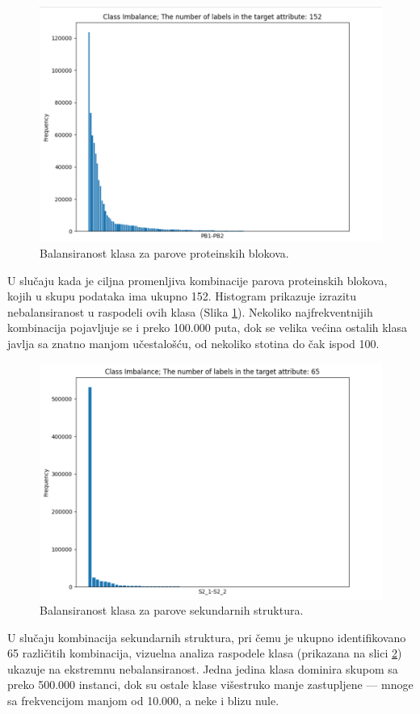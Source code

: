 \documentclass[a4paper,12pt]{article}
\begin{document}
\\
\begin{figure}[htbp]
    \centering
    \includegraphics[width=1\textwidth]{./images/pb_imbalance.png}
    \caption{Balansiranost klasa za parove proteinskih blokova.}
    \label{Slika:pb_imbalance}
\end{figure}

U slučaju kada je ciljna promenljiva kombinacije parova proteinskih blokova, kojih u skupu podataka ima ukupno 152. Histogram prikazuje izrazitu nebalansiranost u raspodeli ovih klasa (Slika \ref{Slika:pb_imbalance}). Nekoliko najfrekventnijih kombinacija pojavljuje se i preko 100.000 puta, dok se velika većina ostalih klasa javlja sa znatno manjom učestalošću, od nekoliko stotina do čak ispod 100.
\\
\begin{figure}[htbp]
    \centering
    \includegraphics[width=1\textwidth]{./images/ss_imbalance.png}
    \caption{Balansiranost klasa za parove sekundarnih struktura.}
    \label{Slika:ss_imbalance}
\end{figure}
U slučaju kombinacija sekundarnih struktura, pri čemu je ukupno identifikovano 65 različitih kombinacija, vizuelna analiza raspodele klasa (prikazana na slici \ref{Slika:ss_imbalance}) ukazuje na ekstremnu nebalansiranost. Jedna jedina klasa dominira skupom sa preko 500.000 instanci, dok su ostale klase višestruko manje zastupljene — mnoge sa frekvencijom manjom od 10.000, a neke i blizu nule.
\\
\end{document}
